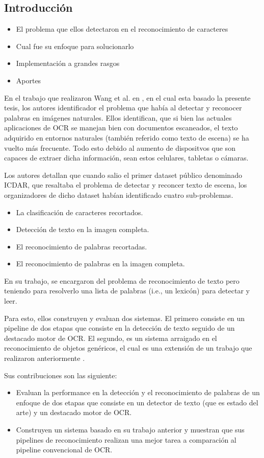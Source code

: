 \subsection{Introducción}

\begin{itemize}
		\item El problema que ellos detectaron en el reconocimiento de caracteres
		\item Cual fue su enfoque para solucionarlo
		\item Implementación a grandes rasgos
		\item Aportes
\end{itemize}


	En el trabajo que realizaron Wang et al. en \cite{wang}, en el cual esta basado la presente tesis, los autores identificador el problema que había al detectar y reconocer palabras en imágenes naturales. Ellos identifican, que si bien las actuales aplicaciones de OCR se manejan bien con documentos escaneados, el texto adquirido en entornos naturales (también referido como texto de escena) se ha vuelto más frecuente. Todo esto debido al aumento de dispositvos que son capaces de extraer dicha información, sean estos celulares, tabletas o cámaras.
	
	Los autores detallan que cuando salio el primer dataset público denominado ICDAR, que resaltaba el problema de detectar y reconcer texto de escena, los organizadores de dicho dataset habían identificado cuatro sub-problemas.
	
	\begin{itemize}
		\item La clasificación de caracteres recortados.
		\item Detección de texto en la imagen completa.
		\item El reconocimiento de palabras recortadas.
		\item El reconocimiento de palabras en la imagen completa.
	\end{itemize}
	
	En su trabajo, se encargaron del problema de reconocimiento de texto pero teniendo para resolverlo una lista de palabras (i.e., un lexicón) para detectar y leer.	
	
	Para esto, ellos construyen y evaluan dos sistemas. El primero consiste en un pipeline de dos etapas que consiste en la detección de texto seguido de un destacado motor de OCR. El segundo, es un sistema arraigado en el reconocimiento de objetos genéricos, el cual es una extensión de un trabajo que realizaron anteriormente \cite{WB10}.
	
	Sus contribuciones son las siguiente:
		\begin{itemize}
			\item Evaluan la performance en la detección y el reconocimiento de palabras de un enfoque de dos etapas que consiste en un detector de texto (que es estado del arte) y un destacado motor de OCR.
			\item Construyen un sistema basado en su trabajo anterior \cite{WB10} y muestran que sus pipelines de reconocimiento realizan una mejor tarea a comparación al pipeline convencional de OCR.
		\end{itemize}